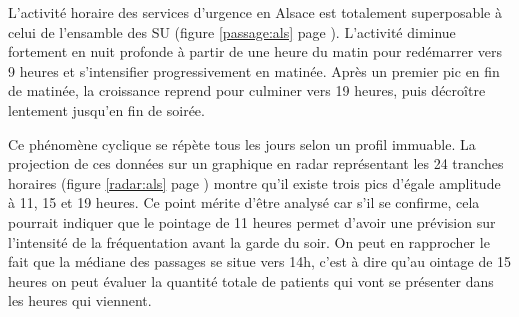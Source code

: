 \documentclass[12pt,english,french,twoside]{report}\usepackage[]{graphicx}\usepackage[]{color}
\begin{document}



L'activité horaire des services d'urgence en Alsace est totalement superposable à celui de l'ensamble des SU (figure \ref{passage:als} page \pageref{passage:als}). L'activité diminue fortement en nuit profonde à partir de une heure du matin pour redémarrer vers 9 heures et s'intensifier progressivement en matinée. Après un premier pic en fin de matinée, la croissance reprend pour culminer vers 19 heures, puis décroître lentement jusqu'en fin de soirée.

Ce phénomène cyclique se répète tous les jours selon un profil immuable. La projection de ces données sur un graphique en radar représentant les 24 tranches horaires (figure \ref{radar:als} page \pageref{radar:als}) montre qu'il existe trois pics d'égale amplitude à 11, 15 et 19 heures. Ce point mérite d'être analysé car s'il se confirme, cela pourrait indiquer que le pointage de 11 heures permet d'avoir une prévision sur l'intensité de la fréquentation avant la garde du soir. On peut en rapprocher le fait que la médiane des passages se situe vers 14h, c'est à dire qu'au ointage de 15 heures on peut évaluer la quantité totale de patients qui vont se présenter dans les heures qui viennent.
\end{document}
